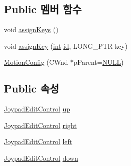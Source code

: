 \subsection*{Public 멤버 함수}
\begin{DoxyCompactItemize}
\item 
void \mbox{\hyperlink{class_motion_config_a73d6bc239e8abd59b68f23ddaaf6daf4}{assign\+Keys}} ()
\item 
void \mbox{\hyperlink{class_motion_config_a50d94176c92cf39ca894892a0b3bf2ef}{assign\+Key}} (\mbox{\hyperlink{_util_8cpp_a0ef32aa8672df19503a49fab2d0c8071}{int}} \mbox{\hyperlink{_commands_8cpp_a7b7a6396b2c82ad46c6d8b2bf141a8dd}{id}}, L\+O\+N\+G\+\_\+\+P\+TR key)
\item 
\mbox{\hyperlink{class_motion_config_a005e9fbe2d6a2d783a48e1bc3b6aa27e}{Motion\+Config}} (C\+Wnd $\ast$p\+Parent=\mbox{\hyperlink{_system_8h_a070d2ce7b6bb7e5c05602aa8c308d0c4}{N\+U\+LL}})
\end{DoxyCompactItemize}
\subsection*{Public 속성}
\begin{DoxyCompactItemize}
\item 
\mbox{\hyperlink{class_joypad_edit_control}{Joypad\+Edit\+Control}} \mbox{\hyperlink{class_motion_config_a44c25ec4fbd230d6fe19416d8c280157}{up}}
\item 
\mbox{\hyperlink{class_joypad_edit_control}{Joypad\+Edit\+Control}} \mbox{\hyperlink{class_motion_config_ae9203bef30efdd067ea44d1f7cded8dc}{right}}
\item 
\mbox{\hyperlink{class_joypad_edit_control}{Joypad\+Edit\+Control}} \mbox{\hyperlink{class_motion_config_a634ed163b30d08aceb8573542ee7fc07}{left}}
\item 
\mbox{\hyperlink{class_joypad_edit_control}{Joypad\+Edit\+Control}} \mbox{\hyperlink{class_motion_config_a0fd0b825d61a2959b3dd20ea3c0fb9ad}{down}}
\end{DoxyCompactItemize}
